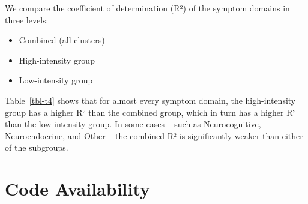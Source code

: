 \documentclass[
  letterpaper,
  DIV=11,
  numbers=noendperiod]{scrartcl}
\providecommand{\tightlist}{%
  \setlength{\itemsep}{0pt}\setlength{\parskip}{0pt}}
\begin{document}
We compare the coefficient of determination (R²) of the symptom domains
in three levels:

\begin{itemize}
\tightlist
\item
  Combined (all clusters)
\item
  High-intensity group
\item
  Low-intensity group
\end{itemize}

\FloatBarrier

\begin{table}[h]

\caption{\label{tbl-t4}R² by Domain}


\end{table}%

Table~\ref{tbl-t4} shows that for almost every symptom domain, the
high-intensity group has a higher R² than the combined group, which in
turn has a higher R² than the low-intensity group. In some cases -- such
as Neurocognitive, Neuroendocrine, and Other -- the combined R² is
significantly weaker than either of the subgroups.

\FloatBarrier
\bigskip

\section*{Code Availability}\label{sec-code}
\end{document}
